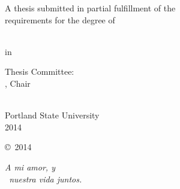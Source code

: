 \begin{SingleSpace}
\begin{center}
  A thesis submitted in partial fulfillment of the\\
  requirements for the degree of
\end{center}

\vfill

\begin{center}
  \thesisDegree\\
  in\\
  \thesisDept
\end{center}

\vfill

\begin{center}
  Thesis Committee:\\
  \thesisAdvisor, Chair\\
  \thesisCommitteeOne\\
  \thesisCommitteeTwo
\end{center}

\vfill

\begin{center}
    Portland State University\\
    2014
\end{center}
\end{SingleSpace}

\cleardoublepage  %
\thispagestyle{empty}

\begin{center}
    \vspace*{2.5 in}
    \copyright~2014 \thesisAuthor
\end{center}

\cleardoublepage



\clearpage

\vspace*{\fill}
\begin{flushright}
\SingleSpacing
{\sffamily\itshape A mi amor, y\\~nuestra vida juntos.}  %
\end{flushright}


\rmfamily
\normalfont



\clearpage
 

\begin{Spacing}{1.3}
\tableofcontents*  %



\clearpage
\listoftables

\clearpage
\listoffigures
\end{Spacing}


